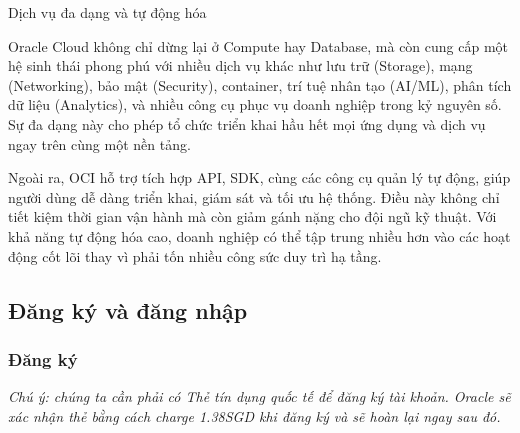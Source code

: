 \begin{myitem}
\begin{mysubitem}
  \end{mysubitem}

\item Dịch vụ đa dạng và tự động hóa

  \begin{mysubitem}
    \item Oracle Cloud không chỉ dừng lại ở Compute hay Database, mà còn cung cấp một hệ sinh thái phong phú với nhiều dịch vụ khác như lưu trữ (Storage), mạng (Networking), bảo mật (Security), container, trí tuệ nhân tạo (AI/ML), phân tích dữ liệu (Analytics), và nhiều công cụ phục vụ doanh nghiệp trong kỷ nguyên số. Sự đa dạng này cho phép tổ chức triển khai hầu hết mọi ứng dụng và dịch vụ ngay trên cùng một nền tảng.
    
    \item Ngoài ra, OCI hỗ trợ tích hợp API, SDK, cùng các công cụ quản lý tự động, giúp người dùng dễ dàng triển khai, giám sát và tối ưu hệ thống. Điều này không chỉ tiết kiệm thời gian vận hành mà còn giảm gánh nặng cho đội ngũ kỹ thuật. Với khả năng tự động hóa cao, doanh nghiệp có thể tập trung nhiều hơn vào các hoạt động cốt lõi thay vì phải tốn nhiều công sức duy trì hạ tầng.
    
  \end{mysubitem}

\end{myitem}

\subsection{Đăng ký và đăng nhập}
\subsubsection{Đăng ký}

\textit{Chú ý: chúng ta cần phải có Thẻ tín dụng quốc tế để đăng ký tài khoản. Oracle sẽ xác nhận thẻ bằng cách charge 1.38SGD khi đăng ký và sẽ hoàn lại ngay sau đó.}

